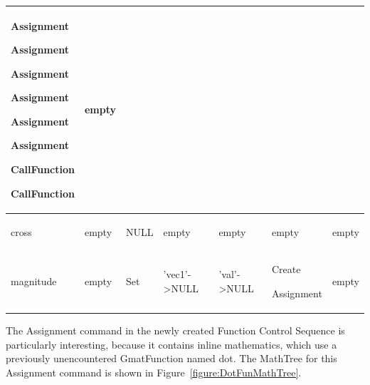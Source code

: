\begin{center}
\begin{supertabular}{|p{0.9in}|p{0.65in}|p{0.62in}|p{0.83in}|p{0.75in}|p{0.8in}|p{0.7in}|}
\begin{small}
Assignment

Assignment

Assignment

Assignment

Assignment

Assignment

CallFunction

CallFunction\end{small} &
\begin{small}empty\end{small}\\
\hline
\begin{small}cross\end{small} & \begin{small}empty\end{small} &
\begin{small}NULL\end{small} & \begin{small}empty\end{small} &
\begin{small}empty\end{small} & \begin{small}empty\end{small} &
\begin{small}empty\end{small}\\
\hline
\begin{small}magnitude\end{small} & \begin{small}empty\end{small} & \begin{small}Set\end{small} &
\begin{small}'vec1'->NULL\end{small} & \begin{small}'val'->NULL\end{small} &
\begin{small}
Create

Assignment 
\end{small} & \begin{small}empty\end{small}\\
\hline
\end{supertabular}
\end{center}

The Assignment command in the newly created Function Control Sequence is particularly interesting,
because it contains inline mathematics, which use a previously unencountered GmatFunction named dot.
 The MathTree for this Assignment command is shown in Figure~\ref{figure:DotFunMathTree}.

